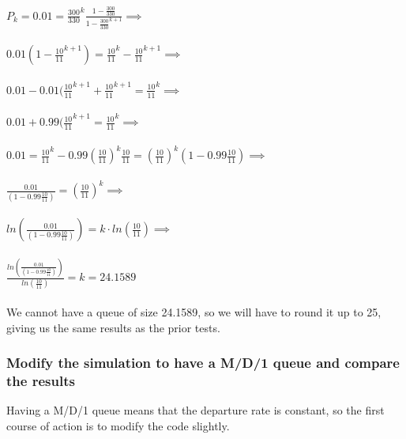 \documentclass[a4paper, titlepage,12pt]{article}
\begin{document}
				\begin{center}
					$P_{k}=0.01=\frac{300}{330}^{k}\frac{1-\frac{300}{330}}{1-\frac{300}{330}^{k+1}} \implies$\\~\\

					$0.01 (1 - \frac{10}{11}^{k+1}) = \frac{10}{11}^k - \frac{10}{11}^{k+1} \implies$\\~\\

					$0.01 - 0.01(\frac{10}{11}^{k+1}+\frac{10}{11}^{k+1}=\frac{10}{11}^k \implies$\\~\\

					$0.01 + 0.99(\frac{10}{11}^{k+1}=\frac{10}{11}^k \implies$\\~\\

					$0.01 = \frac{10}{11}^{k} - 0.99(\frac{10}{11})^k\frac{10}{11} = (\frac{10}{11})^k(1-0.99\frac{10}{11}) \implies$\\~\\

					$\frac{0.01}{(1-0.99\frac{10}{11})} = (\frac{10}{11})^k \implies$\\~\\

					$ln(\frac{0.01}{(1-0.99\frac{10}{11})}) = k \cdot ln(\frac{10}{11}) \implies$\\~\\

					$\frac{ln(\frac{0.01}{(1-0.99\frac{10}{11})})}{ln(\frac{10}{11})} = k = 24.1589$\\~\\

					We cannot have a queue of size 24.1589, so we will have to round it up to 25, giving us the same results as the prior tests.
				\end{center}
				\pagebreak

			\subsubsection*{Modify the simulation to have a M/D/1 queue and compare the results}

				Having a M/D/1 queue means that the departure rate is constant, so the first course of action is to modify the code slightly.
\end{document}
